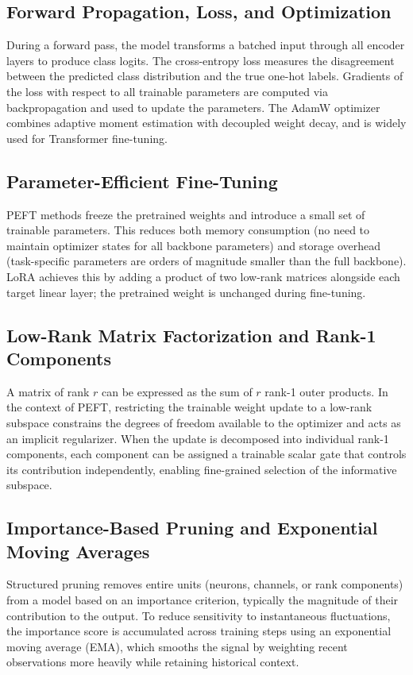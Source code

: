 \documentclass[conference]{IEEEtran}
\begin{document}
\subsection{Forward Propagation, Loss, and Optimization}
During a forward pass, the model transforms a batched input
through all encoder layers to produce class logits. The
cross-entropy loss measures the disagreement between the
predicted class distribution and the true one-hot labels.
Gradients of the loss with respect to all trainable parameters
are computed via backpropagation and used to update the
parameters. The AdamW optimizer \cite{loshchilov2019adamw}
combines adaptive moment estimation with decoupled weight
decay, and is widely used for Transformer fine-tuning.

\subsection{Parameter-Efficient Fine-Tuning}
PEFT methods freeze the pretrained weights and introduce a
small set of trainable parameters. This reduces both memory
consumption (no need to maintain optimizer states for all
backbone parameters) and storage overhead (task-specific
parameters are orders of magnitude smaller than the full
backbone). LoRA \cite{hu2022lora} achieves this by adding a
product of two low-rank matrices alongside each target linear
layer; the pretrained weight is unchanged during fine-tuning.

\subsection{Low-Rank Matrix Factorization and Rank-1 Components}
A matrix of rank $r$ can be expressed as the sum of $r$
rank-1 outer products. In the context of PEFT, restricting the
trainable weight update to a low-rank subspace constrains the
degrees of freedom available to the optimizer and acts as an
implicit regularizer. When the update is decomposed into
individual rank-1 components, each component can be assigned a
trainable scalar gate that controls its contribution
independently, enabling fine-grained selection of the
informative subspace.

\subsection{Importance-Based Pruning and Exponential Moving
Averages}
Structured pruning removes entire units (neurons, channels, or
rank components) from a model based on an importance criterion,
typically the magnitude of their contribution to the output.
To reduce sensitivity to instantaneous fluctuations, the
importance score is accumulated across training steps using an
exponential moving average (EMA), which smooths the signal by
weighting recent observations more heavily while retaining
historical context.
\end{document}
